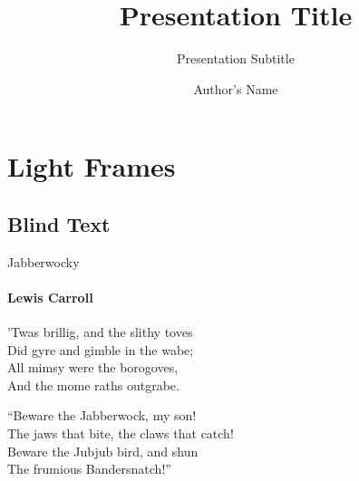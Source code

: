 \documentclass{beamer}
\title{Presentation Title} %
\subtitle{Presentation Subtitle} %
\author{Author's Name}
\begin{document}
  \frame{\maketitle}


    \section{Light Frames}
    \subsection{Blind Text}
    \begin{frame}{Jabberwocky}
      \framesubtitle{Lewis Carroll}%
      'Twas brillig, and the slithy toves\\
      Did gyre and gimble in the wabe;\\
      All mimsy were the borogoves,\\
      And the mome raths outgrabe.\\\bigskip

      “Beware the Jabberwock, my son!\\
      The jaws that bite, the claws that catch!\\
      Beware the Jubjub bird, and shun\\
      The frumious Bandersnatch!”\\
    \end{frame}
\end{document}
